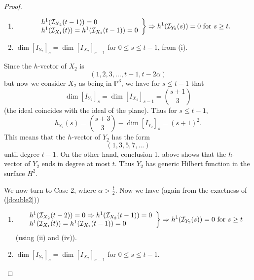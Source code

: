 \documentclass[12pt]{amsart}%
\numberwithin{equation}{section}
\theoremstyle{definition}
\numberwithin{equation}{section}
\begin{document}
\begin{proof}
\begin{enumerate}

\item 
\[
\left.
\begin{array}{l}
h^1(\mathcal I_{X_2}(t-1)) = 0 \\
h^1(\mathcal I_{X_1}(t)) = h^1(\mathcal I_{X_1}(t-1)) = 0
\end{array}
\right \}
\Rightarrow
h^1(\mathcal I_{Y_2}(s)) = 0 \hbox{ for } s \geq t.
\]



\item $\dim [I_{Y_2}]_s = \dim [I_{X_2}]_{s-1}$ for $0 \leq s \leq t-1$, from (i).
    
\end{enumerate}

Since the $h$-vector of $X_2$ is
\[
(1,2,3,\dots,t-1,t-2\alpha)
\]
but now we consider $X_2$ as being in $\mathbb P^3$, we have for $s \leq t-1$ that 
\begin{equation} \label{dimY2}
\dim [I_{Y_2}]_s = \dim [I_{X_2}]_{s-1} =  \binom{s+1}{3} 
\end{equation}
(the ideal coincides with the ideal of the plane). 
Thus for $s \leq t-1$,
\[
h_{Y_2}(s) = \binom{s+3}{3} - \dim [I_{Y_2}]_s = (s+1)^2.
\]
This means that the $h$-vector of ${Y_2}$ has the form
\[
(1,3,5,7,\dots)
\]
until degree $t-1$. On the other hand, conclusion 1. above shows that the $h$-vector of $Y_2$ ends in degree at most $t$. Thus $Y_2$ has generic Hilbert function in the surface $H^2$. 


We now turn to Case 2, {where $\alpha > \frac{t}{2}$.} Now we have (again from the exactness of (\ref{double2}))

\begin{enumerate}

    \item 
    \[
    \left. 
\begin{array}{l}
h^1(\mathcal I_{X_2}(t-2)) = 0 \Rightarrow h^1(\mathcal I_{X_2}(t-1)) = 0 \\
h^1(\mathcal I_{X_1}(t)) = h^1(\mathcal I_{X_1}(t-1)) = 0
\end{array}
\right \}
\Rightarrow h^1(\mathcal I_{Y_2}(s)) = 0 \hbox{ for } s \geq t
    \]
    (using (ii) and (iv)).

    \item $\dim [I_{Y_2}]_s = \dim [I_{X_2}]_{s-1}$ for $0 \leq s \leq t-1$.
    
\end{enumerate}


\end{proof}
\end{document}
